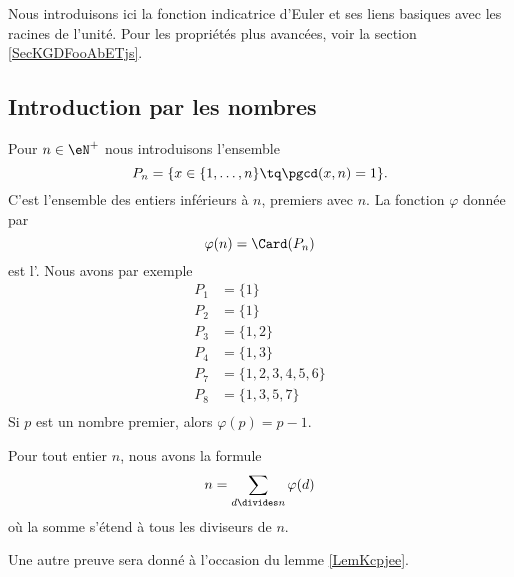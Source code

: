 Nous introduisons ici la fonction indicatrice d'Euler et ses liens basiques avec les racines de l'unité. Pour les propriétés plus avancées, voir la section \ref{SecKGDFooAbETjs}.

\subsection{Introduction par les nombres}

Pour \( n\in\eN^+\) nous introduisons l'ensemble
\begin{equation}    \label{EqDefPnEntierldeost}
    P_n=\{ x\in\{ 1,\ldots,n \}\tq\pgcd(x,n)=1 \}.
\end{equation}
C'est l'ensemble des entiers inférieurs à \( n\), premiers avec \( n\). La fonction \( \varphi\) donnée par
\begin{equation}    \label{EqEulerGqPsvi}
    \varphi(n)=\Card(P_n)
\end{equation}
est l'. Nous avons par exemple
\begin{subequations}
    \begin{align}
        P_1&=\{ 1 \}\\
        P_2&=\{ 1 \}\\
        P_3&=\{ 1,2 \}\\
        P_4&=\{ 1,3 \}\\
        P_7&=\{ 1,2,3,4,5,6 \}\\
        P_8&=\{ 1,3,5,7 \}\\
    \end{align}
\end{subequations}
Si \( p\) est un nombre premier, alors \( \varphi(p)=p-1\).

\begin{proposition}
    Pour tout entier \( n\), nous avons la formule
    \begin{equation}
        n=\sum_{d\divides n}\varphi(d)
    \end{equation}
    où la somme s'étend à tous les diviseurs de \( n\).
\end{proposition}
Une autre preuve sera donné à l'occasion du lemme \ref{LemKcpjee}.

